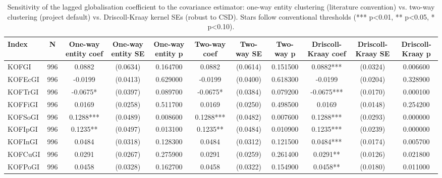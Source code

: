 \begin{table}[htbp]
\caption{Sensitivity of the lagged globalisation coefficient to the covariance estimator: one-way entity clustering (literature convention) vs. two-way clustering (project default) vs. Driscoll-Kraay kernel SEs (robust to CSD). Stars follow conventional thresholds (*** p<0.01, ** p<0.05, * p<0.10).}
\label{tab:se_comparison}
\begin{tabular}{lcccccccccc}
\toprule
Index & N & One-way entity coef & One-way entity SE & One-way entity p & Two-way coef & Two-way SE & Two-way p & Driscoll-Kraay coef & Driscoll-Kraay SE & Driscoll-Kraay p \\
\midrule
KOFGI & 996 & 0.0882 & (0.0634) & 0.164700 & 0.0882 & (0.0614) & 0.151500 & 0.0882*** & (0.0324) & 0.006600 \\
KOFEcGI & 996 & -0.0199 & (0.0413) & 0.629000 & -0.0199 & (0.0400) & 0.618300 & -0.0199 & (0.0204) & 0.328900 \\
KOFTrGI & 996 & -0.0675* & (0.0397) & 0.089700 & -0.0675* & (0.0384) & 0.079200 & -0.0675*** & (0.0170) & 0.000100 \\
KOFFiGI & 996 & 0.0169 & (0.0258) & 0.511700 & 0.0169 & (0.0250) & 0.498500 & 0.0169 & (0.0148) & 0.254200 \\
KOFSoGI & 996 & 0.1288*** & (0.0489) & 0.008600 & 0.1288*** & (0.0482) & 0.007600 & 0.1288*** & (0.0293) & 0.000000 \\
KOFIpGI & 996 & 0.1235** & (0.0497) & 0.013100 & 0.1235** & (0.0484) & 0.010900 & 0.1235*** & (0.0239) & 0.000000 \\
KOFInGI & 996 & 0.0484 & (0.0318) & 0.128300 & 0.0484 & (0.0312) & 0.121500 & 0.0484*** & (0.0174) & 0.005700 \\
KOFCuGI & 996 & 0.0291 & (0.0267) & 0.275900 & 0.0291 & (0.0259) & 0.261400 & 0.0291** & (0.0126) & 0.021800 \\
KOFPoGI & 996 & 0.0458 & (0.0328) & 0.162700 & 0.0458 & (0.0322) & 0.154900 & 0.0458** & (0.0180) & 0.011000 \\
\bottomrule
\end{tabular}
\end{table}
